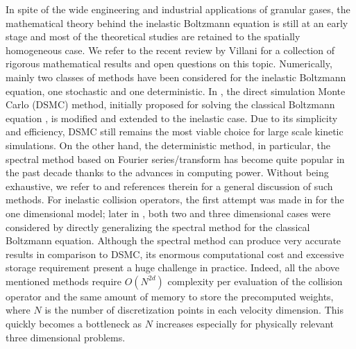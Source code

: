 \documentclass[review,times]{elsarticle}
\begin{document}
In spite of the wide engineering and industrial applications of granular gases, the mathematical theory behind the inelastic Boltzmann equation is still at an early stage and most of the theoretical studies are retained to the spatially homogeneous case. We refer to the recent review by Villani \cite{Villani2006} for a collection of rigorous mathematical results and open questions on this topic. Numerically, mainly two classes of methods have been considered for the inelastic Boltzmann equation, one stochastic and one deterministic. In \cite{MS00, GRW05, RW07}, the direct simulation Monte Carlo (DSMC) method, initially proposed for solving the classical Boltzmann equation \cite{Bird}, is modified and extended to the inelastic case. Due to its simplicity and efficiency, DSMC still remains the most viable choice for large scale kinetic simulations. On the other hand, the deterministic method, in particular, the spectral method based on Fourier series/transform has become quite popular in the past decade thanks to the advances in computing power. Without being exhaustive, we refer to \cite{DP14} and references therein for a general discussion of such methods. For inelastic collision operators, the first attempt was made in \cite{NPT03} for the one dimensional model; later in \cite{FPT05, GT09, FR13}, both two and three dimensional cases were considered by directly generalizing the spectral method for the classical Boltzmann equation. Although the spectral method can produce very accurate results in comparison to DSMC, its enormous computational cost and excessive storage requirement present a huge challenge in practice. Indeed, all the above mentioned methods require $O(N^{2d})$ complexity per evaluation of the collision operator and the same amount of memory to store the precomputed weights, where $N$ is the number of discretization points in each velocity dimension. This quickly becomes a bottleneck as $N$ increases especially for physically relevant three dimensional problems.
\end{document}
